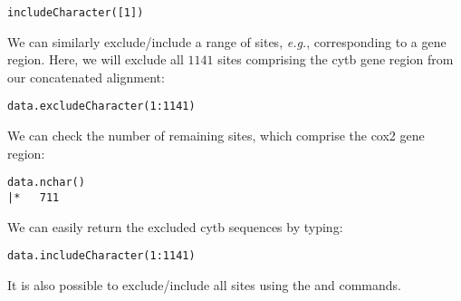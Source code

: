 {\tt \begin{snugshade*}
\begin{lstlisting}
includeCharacter([1])
\end{lstlisting}
\end{snugshade*}}


We can similarly exclude/include a range of sites, {\it e.g.}, corresponding to a gene region.
Here, we will exclude all $1141$ sites comprising the cytb gene region from our concatenated alignment:
{\tt \begin{snugshade*}
\begin{lstlisting}
data.excludeCharacter(1:1141)
\end{lstlisting}
\end{snugshade*}}

We can check the number of remaining sites, which comprise the cox2 gene region:
{\tt \begin{snugshade*}
\begin{lstlisting}
data.nchar()
|*   711
\end{lstlisting}
\end{snugshade*}}

We can easily return the excluded cytb sequences by typing:
{\tt \begin{snugshade*}
\begin{lstlisting}
data.includeCharacter(1:1141)
\end{lstlisting}
\end{snugshade*}}

It is also possible to exclude/include all sites using the  and  commands.



%
%
%
%

